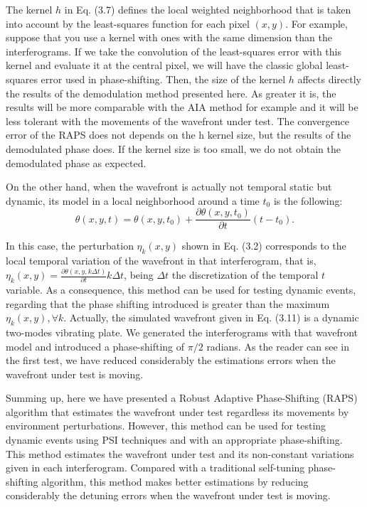 The kernel $h$ in Eq. (3.7) defines the local weighted neighborhood that is
taken into account by the least-squares function for each pixel $(x,y)$. For
example, suppose that you use a kernel with ones with the same dimension than
the interferograms. If we take the convolution of the least-squares error with
this kernel and evaluate it at the central pixel, we will have the classic
global least-squares error used in phase-shifting. Then, the size of the kernel
$h$ affects directly the results of the demodulation method presented here. As
greater it is, the results will be more comparable with the AIA method for
example and it will be less tolerant with the movements of the wavefront under
test. The convergence error of the RAPS does not depends on the h kernel
size, but the results of the demodulated phase does. If the kernel size is too
small, we do not obtain the demodulated phase as expected.

On the other hand, when the wavefront is actually not temporal static but
dynamic, its model in a local neighborhood around a time $t_0$ is the following:
\begin{equation}
 \theta(x,y,t)= \theta(x,y,t_0) + \frac{\partial \theta(x,y,t_0) }{\partial t}
 (t-t_0).
\end{equation}

In this case, the perturbation $\eta_k(x,y)$ shown in Eq. (3.2) corresponds to
the local temporal variation of the wavefront in that interferogram, that is,
$\eta_k (x,y)= \frac{\partial \theta(x,y,k\Delta t)}{\partial t} k \Delta t$,
being $\Delta t$ the discretization of the temporal $t$ variable. As a
consequence, this method can be used for testing dynamic events, regarding that
the phase shifting introduced is greater than the maximum $\eta_k(x,y),\forall
k$. Actually, the simulated wavefront given in Eq. (3.11) is a dynamic
two-modes vibrating plate. We generated the interferograms with that wavefront
model and introduced a phase-shifting of $\pi/2$ radians. As the reader can
see in the first test, we have reduced considerably the estimations errors when
the wavefront under test is moving.

Summing up, here we have presented a Robust Adaptive Phase-Shifting (RAPS)
algorithm that estimates the wavefront under test regardless its movements by
environment perturbations. However, this method can be used for testing dynamic
events using PSI techniques and with an appropriate phase-shifting. This method
estimates the wavefront under test and its non-constant variations given in each
interferogram. Compared with a traditional self-tuning phase-shifting algorithm,
this method makes better estimations by reducing considerably the detuning
errors when the wavefront under test is moving.
